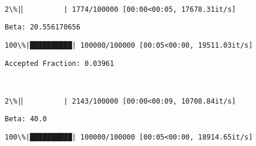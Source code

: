 \documentclass[11pt]{article}
\begin{document}
    \begin{center}
    \end{center}
    { \hspace*{\fill} \\}
    
    \begin{Verbatim}[commandchars=\\\{\}]
  2\%|▏         | 1774/100000 [00:00<00:05, 17678.31it/s]
    \end{Verbatim}

    \begin{Verbatim}[commandchars=\\\{\}]
Beta: 20.556170656

    \end{Verbatim}

    \begin{Verbatim}[commandchars=\\\{\}]
100\%|██████████| 100000/100000 [00:05<00:00, 19511.03it/s]

    \end{Verbatim}

    \begin{Verbatim}[commandchars=\\\{\}]
Accepted Fraction: 0.03961

    \end{Verbatim}

    \begin{center}
    \end{center}
    { \hspace*{\fill} \\}
    
    \begin{Verbatim}[commandchars=\\\{\}]
  2\%|▏         | 2143/100000 [00:00<00:09, 10708.84it/s]
    \end{Verbatim}

    \begin{Verbatim}[commandchars=\\\{\}]
Beta: 40.0

    \end{Verbatim}

    \begin{Verbatim}[commandchars=\\\{\}]
100\%|██████████| 100000/100000 [00:05<00:00, 18914.65it/s]

    \end{Verbatim}
\end{document}
